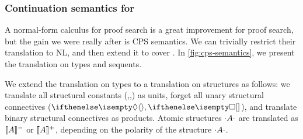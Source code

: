 \documentclass[10pt,a4paper]{llncs}
\begin{document}
\subsubsection*{Continuation semantics for \NLCL}
\label{sec:continuation-semantics}
A normal-form calculus for proof search is a great improvement for
proof search, but the gain we were really after is  CPS semantics.
We can trivially restrict their translation to NL, and then extend
it to cover \NLCL.
In \autoref{fig:cps-semantics}, we present the translation on types
and sequents.

We extend the translation on types to a translation on structures as
follows: we translate all structural constants (\I,\B,\C) as units,
forget all unary structural connectives ($\di,\sq$), and translate
binary structural connectives as products. Atomic structures $\cdot A \cdot$
are translated as $\llbracket A\rrbracket^-$ or $\llbracket A\rrbracket^+$, depending on the polarity
of the structure $\cdot A \cdot$.
\end{document}
